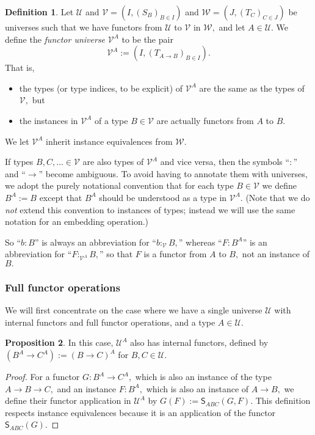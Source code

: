 \documentclass[a4paper]{article}
\theoremstyle{definition}
\newtheorem{definition}{Definition}[section]
\newtheorem{proposition}[definition]{Proposition}
\theoremstyle{remark}
\newcommand{\defn}{\emph}
\newcommand{\U}{\mathcal{U}}
\newcommand{\V}{\mathcal{V}}
\newcommand{\W}{\mathcal{W}}
\newcommand{\nm}{\mathsf}
\newcommand{\combinator}{\nm}
\newcommand{\revSubstFun}{\combinator{S}}
\begin{document}
\begin{definition}
  Let $\U$ and $\V = (I, (S_B)_{B \in I})$ and $\W = (J, (T_C)_{C \in J})$ be universes
  such that we have functors from $\U$ to $\V$ in $\W,$ and let $A \in \U.$
  We define the \defn{functor universe} $\V^A$ to be the pair
  \[\V^A := (I, (T_{A \to B})_{B \in I}).\]
  That is,
  \begin{itemize}
    \item the types (or type indices, to be explicit) of $\V^A$ are the same as the types
    of $\V,$ but
    \item the instances in $\V^A$ of a type $B \in \V$ are actually functors from $A$ to $B.$
  \end{itemize}
  We let $\V^A$ inherit instance equivalences from $\W.$
\end{definition}

If types $B,C,\ldots \in \V$ are also types of $\V^A$ and vice versa, then the symbols
``$:$'' and ``$\to$'' become ambiguous. To avoid having to annotate them with universes, we
adopt the purely notational convention that for each type $B \in \V$ we define $B^A := B$
except that $B^A$ should be understood as a type in $\V^A.$ (Note that we do \emph{not}
extend this convention to instances of types; instead we will use the same notation for an
embedding operation.)

So ``$b : B$'' is always an abbreviation for ``$b :_\V B,$'' whereas ``$F : B^A$'' is an
abbreviation for ``$F :_{\V^A} B,$'' so that $F$ is a functor from $A$ to $B,$ not an
instance of $B.$

\subsubsection*{Full functor operations}

We will first concentrate on the case where we have a single universe $\U$ with internal
functors and full functor operations, and a type $A \in \U.$

\begin{proposition}
  \label{prp:fun-univ-full}
  In this case, $\U^A$ also has internal functors, defined by $(B^A \to C^A) := (B \to C)^A$
  for $B,C \in \U.$
\end{proposition}
\vspace{-1ex}
\begin{proof}
  For a functor $G : B^A \to C^A,$ which is also an instance of the type $A \to B \to C,$
  and an instance $F : B^A,$ which is also an instance of $A \to B,$ we define their functor
  application in $\U^A$ by $G(F) := \revSubstFun_{ABC}(G,F).$ This definition
  respects instance equivalences because it is an application of the functor
  $\revSubstFun_{ABC}(G).$
\end{proof}
\end{document}
